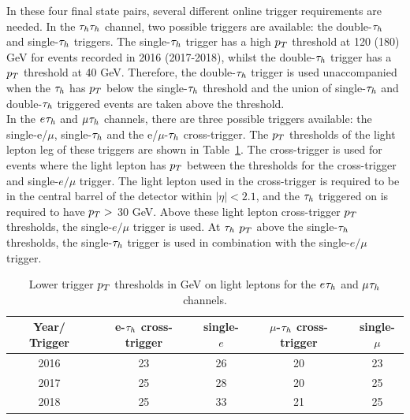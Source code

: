 In these four final state pairs, several different online trigger requirements are needed.
In the $\tau_{h}\tau_{h}$ channel, two possible triggers are available: the double-$\tau_{h}$ and single-$\tau_{h}$ triggers.
The single-$\tau_{h}$ trigger has a high $\pT$ threshold at 120 (180) GeV for events recorded in 2016 (2017-2018), whilst the double-$\tau_{h}$ trigger has a $\pT$ threshold at 40 GeV.
Therefore, the double-$\tau_{h}$ trigger is used unaccompanied when the $\tau_{h}$ has $\pT$ below the single-$\tau_{h}$ threshold and the union of single-$\tau_{h}$ and double-$\tau_{h}$ triggered events are taken above the threshold. \\

In the $e_{}\tau_{h}$ and $\mu_{}\tau_{h}$ channels, there are three possible triggers available: the single-e/$\mu$, single-$\tau_{h}$ and the e/$\mu$-$\tau_{h}$ cross-trigger.
The $\pT$ thresholds of the light lepton leg of these triggers are shown in Table~\ref{tab:trig_thresholds}.
The cross-trigger is used for events where the light lepton has $\pT$ between the thresholds for the cross-trigger and single-$e/\mu$ trigger.
The light lepton used in the cross-trigger is required to be in the central barrel of the detector within $|\eta| < 2.1$, and the $\tau_{h}$ triggered on is required to have $p_{T} >$ 30 GeV.
Above these light lepton cross-trigger $\pT$ thresholds, the single-$e/\mu$ trigger is used.
At $\tau_{h}$ $\pT$ above the single-$\tau_{h}$ thresholds, the single-$\tau_{h}$ trigger is used in combination with the single-$e/\mu$ trigger. \\

\begin{table}[hbtp]
  \centering
  \begin{tabular}{|c||c|c|c|c|}
    \hline
    Year/ Trigger   & e-$\tau_{h}$ cross-trigger & single-$e$ & $\mu$-$\tau_{h}$ cross-trigger & single-$\mu$ \\
    \hline
    \hline
    2016 & 23                    & 26         & 20                     & 23           \\
    2017 & 25                    & 28         & 20                     & 25           \\
    2018 & 25                    & 33         & 21                     & 25           \\
    \hline        
  \end{tabular}
  \caption[Trigger $\pT$ thresholds of light lepton triggers.]{Lower trigger $\pT$ thresholds in GeV on light leptons for the $e_{}\tau_{h}$ and $\mu_{}\tau_{h}$ channels.}
  \label{tab:trig_thresholds}  
\end{table}

